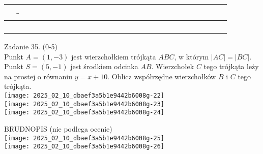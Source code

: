 \documentclass[10pt]{article}
\begin{document}
\begin{center}
\begin{tabular}{|c|c|c|c|c|c|c|c|c|c|c|c|c|c|c|c|c|c|c|c|c|c|c|c|c|c|c|}
 & - &  &  &  &  &  &  &  &  &  &  &  &  &  &  &  &  &  &  &  &  &  &  &  &  &  \\
\hline
 &  &  &  &  &  &  &  &  &  &  &  &  &  &  &  &  &  &  &  &  &  &  &  &  &  &  \\
\hline
 &  &  &  &  &  &  &  &  &  &  &  &  &  &  &  &  &  &  &  &  &  &  &  &  &  &  \\
\hline
 &  &  &  &  &  &  &  &  &  &  &  &  &  &  &  &  &  &  &  &  &  &  &  &  &  &  \\
\hline
 &  &  &  &  &  &  &  &  &  &  &  &  &  &  &  &  &  &  &  &  &  &  &  &  &  &  \\
\hline
\end{tabular}
\end{center}

Zadanie 35. (0-5)\\
Punkt \(A=(1,-3)\) jest wierzchołkiem trójkąta \(A B C\), w którym \(|A C|=|B C|\).\\
Punkt \(S=(5,-1)\) jest środkiem odcinka \(A B\). Wierzchołek \(C\) tego trójkąta leży na prostej o równaniu \(y=x+10\). Oblicz współrzędne wierzchołków \(B\) i \(C\) tego trójkąta.\\
\texttt{[image: 2025\_02\_10\_dbaef3a5b1e9442b6008g-22]}\\
\texttt{[image: 2025\_02\_10\_dbaef3a5b1e9442b6008g-23]}\\
\texttt{[image: 2025\_02\_10\_dbaef3a5b1e9442b6008g-24]}

BRUDNOPIS (nie podlega ocenie)\\
\texttt{[image: 2025\_02\_10\_dbaef3a5b1e9442b6008g-25]}\\
\texttt{[image: 2025\_02\_10\_dbaef3a5b1e9442b6008g-26]}
\end{document}
